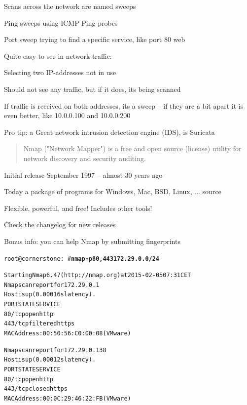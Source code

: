 \documentclass[Screen16to9,17pt]{foils}
\begin{document}
\begin{list1}
\item Scans across the network are named sweeps
\item Ping sweeps using ICMP Ping probes
\item Port sweep trying to find a specific service, like port 80 web
\item Quite easy to see in network traffic:
\begin{list2}
\item Selecting two IP-addresses not in use
\item Should not see any traffic, but if it does, its being scanned
\item If traffic is received on both addresses, its a sweep -- if they are a bit apart it is even better, like 10.0.0.100 and 10.0.0.200
  \end{list2}

\vskip 2cm
Pro tip: a Great network intrusion detection engine (IDS), is Suricata 
\end{list1}

\begin{quote}
Nmap ("Network Mapper") is a free and open source (license) utility for network discovery and security auditing.
\end{quote}

\begin{list1}
\item Initial release September 1997 -- almost 30 years ago
\item Today a package of programs for Windows, Mac, BSD, Linux, ... source
\item Flexible, powerful, and free! Includes other tools!
\item Check the changelog for new releases\\
\end{list1}

Bonus info: you can help Nmap by submitting fingerprints



\begin{alltt}\small
root@cornerstone:~#{\bfseries  nmap -p80,443 172.29.0.0/24}

Starting Nmap 6.47 ( http://nmap.org ) at 2015-02-05 07:31 CET
Nmap scan report for 172.29.0.1
Host is up (0.00016s latency).
PORT    STATE    SERVICE
{\color{darkgreen}80/tcp  open     http}
443/tcp filtered https
MAC Address: 00:50:56:C0:00:08 (VMware)

Nmap scan report for 172.29.0.138
Host is up (0.00012s latency).
PORT    STATE  SERVICE
{\color{darkgreen}80/tcp  open   http}
443/tcp closed https
MAC Address: 00:0C:29:46:22:FB (VMware)

\end{alltt}
\end{document}
